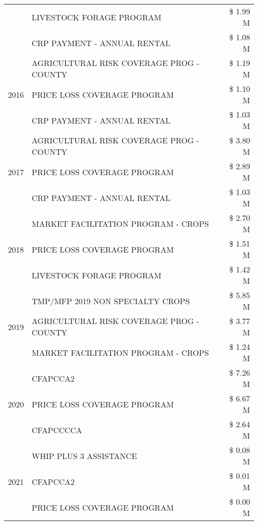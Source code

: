 \begin{tabular}{llr}
 & LIVESTOCK FORAGE PROGRAM & \$ 1.99 M \\
 & CRP PAYMENT - ANNUAL RENTAL & \$ 1.08 M \\
\cline{1-3}
\multirow[t]{3}{*}{2016} & AGRICULTURAL RISK COVERAGE PROG - COUNTY & \$ 1.19 M \\
 & PRICE LOSS COVERAGE PROGRAM & \$ 1.10 M \\
 & CRP PAYMENT - ANNUAL RENTAL & \$ 1.03 M \\
\cline{1-3}
\multirow[t]{3}{*}{2017} & AGRICULTURAL RISK COVERAGE PROG - COUNTY & \$ 3.80 M \\
 & PRICE LOSS COVERAGE PROGRAM & \$ 2.89 M \\
 & CRP PAYMENT - ANNUAL RENTAL & \$ 1.03 M \\
\cline{1-3}
\multirow[t]{3}{*}{2018} & MARKET FACILITATION PROGRAM - CROPS & \$ 2.70 M \\
 & PRICE LOSS COVERAGE PROGRAM & \$ 1.51 M \\
 & LIVESTOCK FORAGE PROGRAM & \$ 1.42 M \\
\cline{1-3}
\multirow[t]{3}{*}{2019} & TMP/MFP 2019 NON SPECIALTY CROPS & \$ 5.85 M \\
 & AGRICULTURAL RISK COVERAGE PROG - COUNTY & \$ 3.77 M \\
 & MARKET FACILITATION PROGRAM - CROPS & \$ 1.24 M \\
\cline{1-3}
\multirow[t]{3}{*}{2020} & CFAPCCA2 & \$ 7.26 M \\
 & PRICE LOSS COVERAGE PROGRAM & \$ 6.67 M \\
 & CFAPCCCCA & \$ 2.64 M \\
\cline{1-3}
\multirow[t]{3}{*}{2021} & WHIP PLUS 3 ASSISTANCE & \$ 0.08 M \\
 & CFAPCCA2 & \$ 0.01 M \\
 & PRICE LOSS COVERAGE PROGRAM & \$ 0.00 M \\
\cline{1-3}
\bottomrule
\end{tabular}
